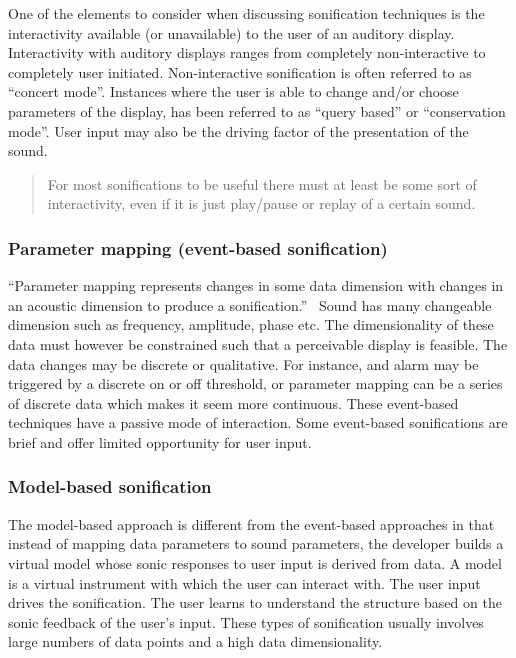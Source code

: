 One of the elements to consider when discussing sonification techniques is the interactivity available (or unavailable) to the user of an auditory display. 
Interactivity with auditory displays ranges from completely non-interactive to completely user initiated. 
Non-interactive sonification is often referred to as “concert mode”. 
Instances where the user is able to change and/or choose parameters of the display, has been referred to as “query based” or “conservation mode”. 
User input may also be the driving factor of the presentation of the sound. 

\blockquote{For most sonifications to be useful there must at least be some sort of interactivity, even if it is just play/pause or replay of a certain sound.}\cite*{Hermann2011}



\subsubsection*{Parameter mapping (event-based sonification)} %
\label{ssub:parameter_mapping_event_based_sonification_}

\enquote{Parameter mapping represents changes in some data dimension with changes in an acoustic dimension to produce a sonification.}~\cite*{Hermann2011}
Sound has many changeable dimension such as frequency, amplitude, phase etc. 
The dimensionality of these data must however be constrained such that a perceivable display is feasible. 
The data changes may be discrete or qualitative. 
For instance, and alarm may be triggered by a discrete on or off threshold, or parameter mapping can be a series of discrete data which makes it seem more continuous. 
These event-based techniques have a passive mode of interaction. 
Some event-based sonifications are brief and offer limited opportunity for user input. 



\subsubsection*{Model-based sonification} %
\label{ssub:model_based_sonification}

The model-based approach is different from the event-based approaches in that instead of mapping data parameters to sound parameters, the developer builds a virtual model whose sonic responses to user input is derived from data. 
A model is a virtual instrument with which the user can interact with. 
The user input drives the sonification. 
The user learns to understand the structure based on the sonic feedback of the user’s input. 
These types of sonification usually involves large numbers of data points and a high data dimensionality.

